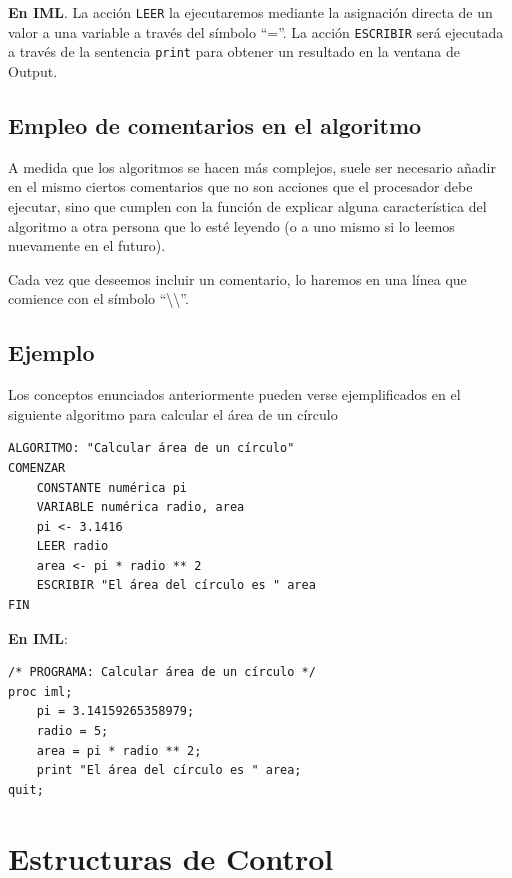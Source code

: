 \documentclass[]{book}
\begin{document}
\textbf{En IML}. La acción \texttt{LEER} la ejecutaremos mediante la asignación directa de un valor a una variable a través del símbolo ``=''. La acción \texttt{ESCRIBIR} será ejecutada a través de la sentencia \texttt{print} para obtener un resultado en la ventana de Output.

\hypertarget{empleo-de-comentarios-en-el-algoritmo}{%
\section{Empleo de comentarios en el algoritmo}\label{empleo-de-comentarios-en-el-algoritmo}}

A medida que los algoritmos se hacen más complejos, suele ser necesario añadir en el mismo ciertos comentarios que no son acciones que el procesador debe ejecutar, sino que cumplen con la función de explicar alguna característica del algoritmo a otra persona que lo esté leyendo (o a uno mismo si lo leemos nuevamente en el futuro).

Cada vez que deseemos incluir un comentario, lo haremos en una línea que comience con el símbolo ``\textbackslash{}\textbackslash{}''.

\hypertarget{ejemplo}{%
\section{Ejemplo}\label{ejemplo}}

Los conceptos enunciados anteriormente pueden verse ejemplificados en el siguiente algoritmo para calcular el área de un círculo

\begin{verbatim}
ALGORITMO: "Calcular área de un círculo"
COMENZAR
    CONSTANTE numérica pi
    VARIABLE numérica radio, area
    pi <- 3.1416
    LEER radio
    area <- pi * radio ** 2
    ESCRIBIR "El área del círculo es " area
FIN
\end{verbatim}

\textbf{En IML}:

\begin{verbatim}
/* PROGRAMA: Calcular área de un círculo */
proc iml;
    pi = 3.14159265358979;
    radio = 5;
    area = pi * radio ** 2;
    print "El área del círculo es " area;
quit;
\end{verbatim}

\hypertarget{estructuras-de-control}{%
\chapter{Estructuras de Control}\label{estructuras-de-control}}
\end{document}
